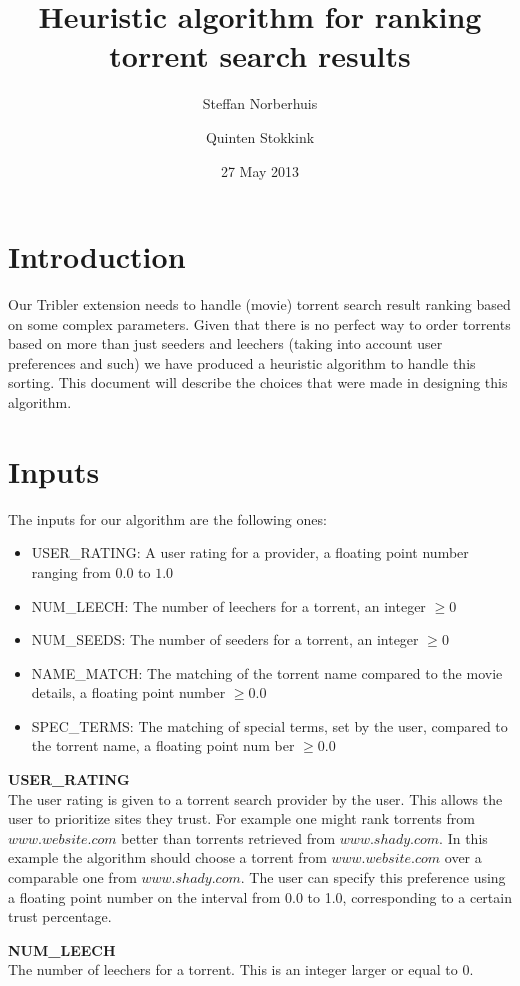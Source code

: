 \documentclass[a4paper,11pt]{article}
\title{Heuristic algorithm for ranking torrent search results}
\author{Steffan Norberhuis \and Quinten Stokkink}
\date{27 May 2013}
\begin{document}
   \maketitle
\section{Introduction}
Our Tribler extension needs to handle (movie) torrent search result ranking based on some complex
parameters. Given that there is no perfect way to order torrents based on more than just
seeders and leechers (taking into account user preferences and such) we have produced a
heuristic algorithm to handle this sorting. This document will describe the choices that were
made in designing this algorithm.

\section{Inputs}
The inputs for our algorithm are the following ones:
\begin{itemize}
\item USER\_RATING: A user rating for a provider, a floating point number ranging from $0.0$ to $1.0$ 
\item NUM\_LEECH: The number of leechers for a torrent, an integer $\ge0$
\item NUM\_SEEDS: The number of seeders for a torrent, an integer $\ge0$
\item NAME\_MATCH: The matching of the torrent name compared to the movie details, a floating point number $\ge 0.0$
\item SPEC\_TERMS: The matching of special terms, set by the user, compared to the torrent name, a floating point num ber $\ge 0.0$
\end{itemize}

\textbf{USER\_RATING}\\
The user rating is given to a torrent search provider by the user.
This allows the user to prioritize sites they trust.
For example one might rank torrents from $www.website.com$ better than torrents retrieved from
$www.shady.com$. In this example the algorithm should choose a torrent from $www.website.com$
over a comparable one from $www.shady.com$.
The user can specify this preference using a floating point number on the interval from 0.0 to 1.0,
corresponding to a certain trust percentage.

\textbf{NUM\_LEECH}\\
The number of leechers for a torrent.
This is an integer larger or equal to 0.
\end{document}
